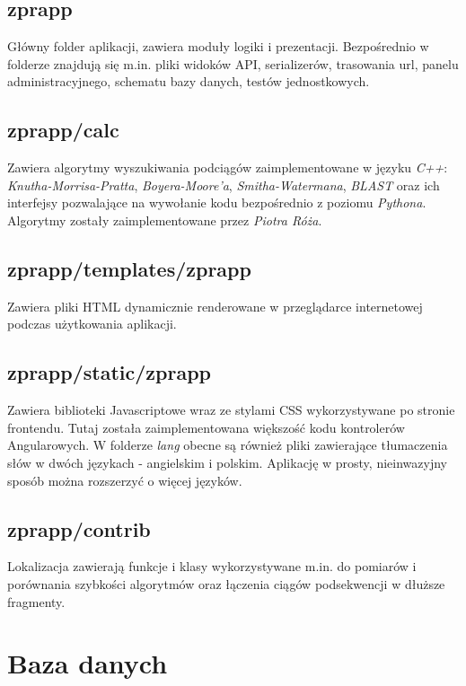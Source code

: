 \subsection*{zprapp}
Główny folder aplikacji, zawiera moduły logiki i prezentacji.
Bezpośrednio w folderze znajdują się m.in. pliki widoków API, serializerów, trasowania url, panelu administracyjnego, schematu bazy danych, testów jednostkowych.

\subsection*{zprapp/calc}
Zawiera algorytmy wyszukiwania podciągów zaimplementowane w języku \textit{C++}: \textit{Knutha-Morrisa-Pratta}, \textit{Boyera-Moore'a}, \textit{Smitha-Watermana}, \textit{BLAST} oraz ich interfejsy pozwalające na wywołanie kodu bezpośrednio z poziomu \textit{Pythona}. Algorytmy zostały zaimplementowane przez \textit{Piotra Róża}.

\subsection*{zprapp/templates/zprapp}
Zawiera pliki HTML dynamicznie renderowane w przeglądarce internetowej podczas użytkowania aplikacji.

\subsection*{zprapp/static/zprapp}
Zawiera biblioteki Javascriptowe wraz ze stylami CSS wykorzystywane po stronie frontendu.
Tutaj została zaimplementowana większość kodu kontrolerów Angularowych.
W folderze \textit{lang} obecne są również pliki zawierające tłumaczenia słów w dwóch językach - angielskim i polskim.
Aplikację w prosty, nieinwazyjny sposób można rozszerzyć o więcej języków.

\subsection*{zprapp/contrib}
Lokalizacja zawierają funkcje i klasy wykorzystywane m.in. do pomiarów i porównania szybkości algorytmów oraz łączenia ciągów podsekwencji w dłuższe fragmenty.


\section{Baza danych}

